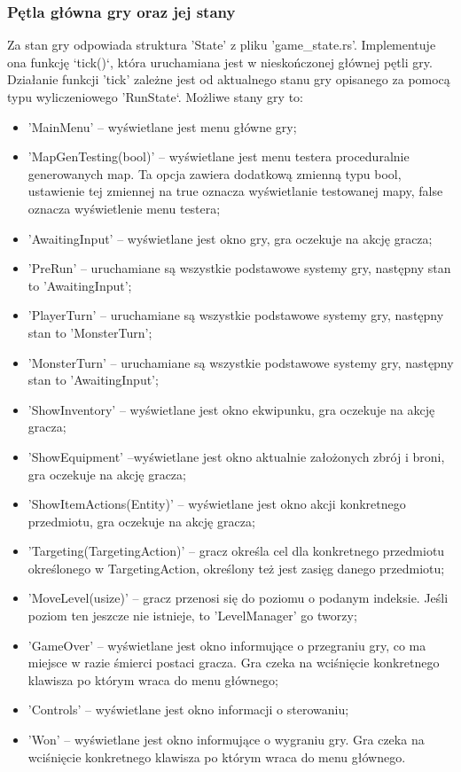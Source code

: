 \documentclass[12pt,twoside]{article}
\begin{document}
\subsubsection{Pętla główna gry oraz jej stany}
Za stan gry odpowiada struktura 'State' z pliku 'game\_state.rs'. Implementuje ona funkcję `tick()`, która uruchamiana jest w nieskończonej głównej pętli gry. Działanie funkcji 'tick' zależne jest od aktualnego stanu gry opisanego za pomocą typu wyliczeniowego 'RunState`. Możliwe stany gry to:
\begin{itemize}
	\item 'MainMenu' -- wyświetlane jest menu główne gry;
	\item 'MapGenTesting(bool)' -- wyświetlane jest menu testera proceduralnie generowanych map. Ta opcja zawiera dodatkową zmienną typu bool, ustawienie tej zmiennej na true oznacza wyświetlanie testowanej mapy, false oznacza wyświetlenie menu testera;
	\item 'AwaitingInput' -- wyświetlane jest okno gry, gra oczekuje na akcję gracza;
	\item 'PreRun' -- uruchamiane są wszystkie podstawowe systemy gry, następny stan to 'AwaitingInput';
	\item 'PlayerTurn' -- uruchamiane są wszystkie podstawowe systemy gry, następny stan to 'MonsterTurn';
	\item 'MonsterTurn' -- uruchamiane są wszystkie podstawowe systemy gry, następny stan to 'AwaitingInput';
	\item 'ShowInventory' -- wyświetlane jest okno ekwipunku, gra oczekuje na akcję gracza;
	\item 'ShowEquipment' --wyświetlane jest okno aktualnie założonych zbrój i broni, gra oczekuje na akcję gracza;
	\item 'ShowItemActions(Entity)' -- wyświetlane jest okno akcji konkretnego przedmiotu, gra oczekuje na akcję gracza;
	\item 'Targeting(TargetingAction)' -- gracz określa cel dla konkretnego przedmiotu określonego w TargetingAction, określony też jest zasięg danego przedmiotu;
	\item 'MoveLevel(usize)' -- gracz przenosi się do poziomu o podanym indeksie. Jeśli poziom ten jeszcze nie istnieje, to 'LevelManager' go tworzy;
	\item 'GameOver' -- wyświetlane jest okno informujące o przegraniu gry, co ma miejsce w razie śmierci postaci gracza. Gra czeka na wciśnięcie konkretnego klawisza po którym wraca do menu głównego;
	\item 'Controls' -- wyświetlane jest okno informacji o sterowaniu;
	\item 'Won' -- wyświetlane jest okno informujące o wygraniu gry. Gra czeka na wciśnięcie konkretnego klawisza po którym wraca do menu głównego.
\end{itemize}
\end{document}
